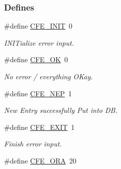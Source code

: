 \subsubsection*{Defines}
\begin{DoxyCompactItemize}
\item 
\hypertarget{group__errors_gaac0ac4dd97f14a0da37622a1497ea004}{\#define \hyperlink{group__errors_gaac0ac4dd97f14a0da37622a1497ea004}{C\-F\-E\-\_\-\-I\-N\-I\-T}~0}\label{group__errors_gaac0ac4dd97f14a0da37622a1497ea004}

\begin{DoxyCompactList}\small\item\em I\-N\-I\-Tialize error input. \end{DoxyCompactList}\item 
\hypertarget{group__errors_gabea2555a62593e79e32879620c4fc8de}{\#define \hyperlink{group__errors_gabea2555a62593e79e32879620c4fc8de}{C\-F\-E\-\_\-\-O\-K}~0}\label{group__errors_gabea2555a62593e79e32879620c4fc8de}

\begin{DoxyCompactList}\small\item\em No error / everything O\-Kay. \end{DoxyCompactList}\item 
\hypertarget{group__errors_gabb576e88369c2eac1ffd41915292968c}{\#define \hyperlink{group__errors_gabb576e88369c2eac1ffd41915292968c}{C\-F\-E\-\_\-\-N\-E\-P}~1}\label{group__errors_gabb576e88369c2eac1ffd41915292968c}

\begin{DoxyCompactList}\small\item\em New Entry successfully Put into D\-B. \end{DoxyCompactList}\item 
\hypertarget{group__errors_gac799901241871d298d9bd9f79e1ce645}{\#define \hyperlink{group__errors_gac799901241871d298d9bd9f79e1ce645}{C\-F\-E\-\_\-\-E\-X\-I\-T}~1}\label{group__errors_gac799901241871d298d9bd9f79e1ce645}

\begin{DoxyCompactList}\small\item\em Finish error input. \end{DoxyCompactList}\item 
\hypertarget{group__errors_gae5e8ef219f287dc0ff0ca70433f78f0e}{\#define \hyperlink{group__errors_gae5e8ef219f287dc0ff0ca70433f78f0e}{C\-F\-E\-\_\-\-O\-R\-A}~20}\label{group__errors_gae5e8ef219f287dc0ff0ca70433f78f0e}


\end{DoxyCompactItemize}
